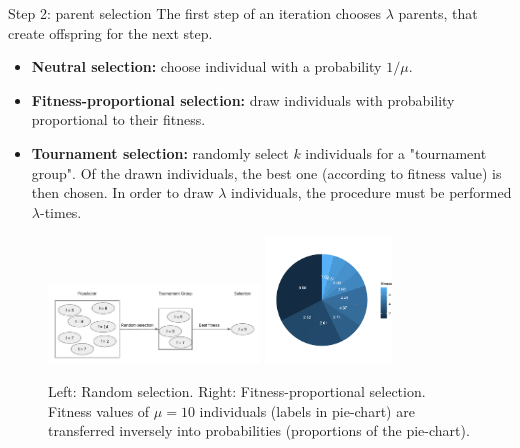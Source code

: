 \documentclass[11pt,compress,t,notes=noshow, xcolor=table]{beamer}
\begin{document}
\begin{vbframe}{Step 2: parent selection}
\footnotesize
The first step of an iteration chooses $\lambda$ parents, that create offspring for the next step.

\begin{itemize}
\item \textbf{Neutral selection: }choose individual with a probability $1/\mu$.
\item \textbf{Fitness-proportional selection: }draw individuals with probability proportional to their fitness.
\item \textbf{Tournament selection: }randomly select $k$ individuals for a "tournament group". Of the drawn individuals, the best one (according to fitness value) is then chosen. In order to draw $\lambda$ individuals, the procedure must be performed $\lambda$-times.
\end{itemize}
\vspace*{-0.2cm}
\begin{figure}
  \includegraphics[width=0.5\textwidth]{figure_man/tournament_selection.png} \includegraphics[width=0.3\textwidth]{figure_man/ea_parent_selection.pdf} \\
  \begin{footnotesize}
  Left: Random selection. Right: Fitness-proportional selection. Fitness values of $\mu = 10$ individuals (labels in pie-chart) are transferred inversely into probabilities (proportions of the pie-chart). 
  \end{footnotesize}
\end{figure}
\end{vbframe}
\end{document}
